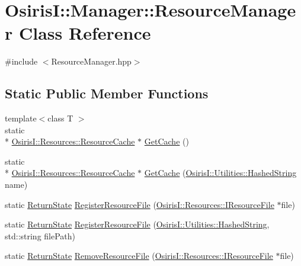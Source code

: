 \hypertarget{class_osiris_i_1_1_manager_1_1_resource_manager}{\section{Osiris\-I\-:\-:Manager\-:\-:Resource\-Manager Class Reference}
\label{class_osiris_i_1_1_manager_1_1_resource_manager}
}


{\ttfamily \#include $<$Resource\-Manager.\-hpp$>$}

\subsection*{Static Public Member Functions}
\begin{DoxyCompactItemize}
\item 
{\footnotesize template$<$class T $>$ }\\static \\*
\hyperlink{class_osiris_i_1_1_resources_1_1_resource_cache}{Osiris\-I\-::\-Resources\-::\-Resource\-Cache} $\ast$ \hyperlink{class_osiris_i_1_1_manager_1_1_resource_manager_a332d20b51308c5db9be8c860c9ac9471}{Get\-Cache} ()
\item 
static \\*
\hyperlink{class_osiris_i_1_1_resources_1_1_resource_cache}{Osiris\-I\-::\-Resources\-::\-Resource\-Cache} $\ast$ \hyperlink{class_osiris_i_1_1_manager_1_1_resource_manager_a9940c5cc275ee8972eb31e7c26b0ab00}{Get\-Cache} (\hyperlink{class_osiris_i_1_1_utilities_1_1_hashed_string}{Osiris\-I\-::\-Utilities\-::\-Hashed\-String} name)
\item 
static \hyperlink{namespace_osiris_i_a8f53bf938dc75c65c6a529694514013e}{Return\-State} \hyperlink{class_osiris_i_1_1_manager_1_1_resource_manager_a7c6f74b6e9ca8ac2b09f1b823c84f61c}{Register\-Resource\-File} (\hyperlink{class_osiris_i_1_1_resources_1_1_i_resource_file}{Osiris\-I\-::\-Resources\-::\-I\-Resource\-File} $\ast$file)
\item 
static \hyperlink{namespace_osiris_i_a8f53bf938dc75c65c6a529694514013e}{Return\-State} \hyperlink{class_osiris_i_1_1_manager_1_1_resource_manager_a1743f19d50af8dc03d4f1a2f554405ce}{Register\-Resource\-File} (\hyperlink{class_osiris_i_1_1_utilities_1_1_hashed_string}{Osiris\-I\-::\-Utilities\-::\-Hashed\-String}, std\-::string file\-Path)
\item 
static \hyperlink{namespace_osiris_i_a8f53bf938dc75c65c6a529694514013e}{Return\-State} \hyperlink{class_osiris_i_1_1_manager_1_1_resource_manager_aa38f8039dc0a0c103ca34db6bb84abf8}{Remove\-Resource\-File} (\hyperlink{class_osiris_i_1_1_resources_1_1_i_resource_file}{Osiris\-I\-::\-Resources\-::\-I\-Resource\-File} $\ast$file)

\end{DoxyCompactItemize}
